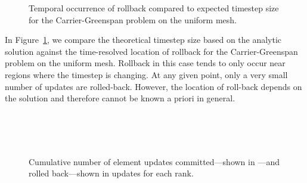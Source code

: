 {\begin{figure}
\centering
{}
\caption{Temporal occurrence of rollback compared to expected timestep size for the Carrier-Greenspan problem on the uniform mesh.}
\label{fig:rb:temporal}
\end{figure}

In Figure~\ref{fig:rb:temporal}, we compare the theoretical timestep size based on the analytic solution against the time-resolved location of rollback for the Carrier-Greenspan problem on the uniform mesh. Rollback in this case tends to only occur near regions where the timestep is changing. At any given point, only a very small number of updates are rolled-back. However, the location of roll-back depends on the solution and therefore cannot be known a priori in general.


\begin{figure}
\centering
{}\\
\\
\\
\caption{Cumulative number of element updates committed---shown in ---and rolled back---shown in  updates for each rank.}
\label{fig:rb:rank}
\end{figure}

}
